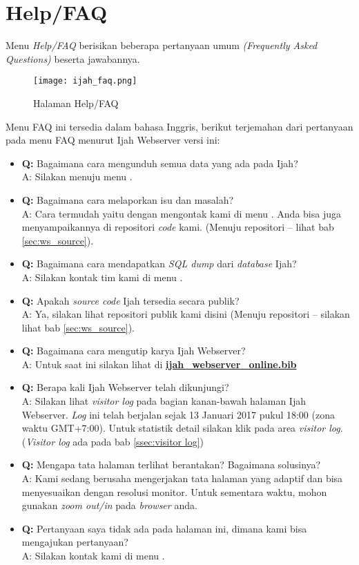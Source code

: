 \section{Help/FAQ}
Menu \emph{Help/FAQ} berisikan beberapa pertanyaan umum \emph{(Frequently Asked Questions)} beserta jawabannya.

\begin{figure}[H]
	\centering
	\texttt{[image: ijah\_faq.png]}
	\caption{Halaman Help/FAQ}
	\label{fig:ijah_faq}
\end{figure}

Menu FAQ ini tersedia dalam bahasa Inggris, berikut terjemahan dari pertanyaan pada menu FAQ menurut Ijah Webserver versi ini:

\begin{itemize}
\item {\textbf{Q:}} Bagaimana cara mengunduh semua data yang ada pada Ijah?\\
A: Silakan menuju menu \textbf{}.
\item {\textbf{Q:}} Bagaimana cara melaporkan isu dan masalah?\\
A: Cara termudah yaitu dengan mengontak kami di menu \textbf{}. Anda bisa juga menyampaikannya di repositori \emph{code} kami. (Menuju repositori -- lihat bab \ref{sec:ws_source}).
\item {\textbf{Q:}} Bagaimana cara mendapatkan \emph{SQL dump} dari \emph{database} Ijah?\\
A: Silakan kontak tim kami di menu \textbf{}.
\item {\textbf{Q:}} Apakah \emph{source code} Ijah tersedia secara publik?\\
A: Ya, silakan lihat repositori publik kami disini (Menuju repositori -- silakan lihat bab \ref{sec:ws_source}).
\item {\textbf{Q:}} Bagaimana cara mengutip karya Ijah Webserver?\\
A: Untuk saat ini silakan lihat di \href{http://ijah.apps.cs.ipb.ac.id/api/ijah_webserver_online.bib}{\textbf{ijah\_webserver\_online.bib}}
\item {\textbf{Q:}} Berapa kali Ijah Webserver telah dikunjungi?\\
A: Silakan lihat \emph{visitor log} pada bagian kanan-bawah halaman Ijah Webserver. \emph{Log} ini telah berjalan sejak 13 Januari 2017 pukul 18:00 (zona waktu GMT+7:00). Untuk statistik detail silakan klik pada area \emph{visitor log}. (\emph{Visitor log} ada pada bab \ref{ssec:visitor log})
\item {\textbf{Q:}} Mengapa tata halaman terlihat berantakan? Bagaimana solusinya?\\
A: Kami sedang berusaha mengerjakan tata halaman yang adaptif dan bisa menyesuaikan dengan resolusi monitor. Untuk sementara waktu, mohon gunakan \emph{zoom out/in} pada \emph{browser} anda.
\item {\textbf{Q:}} Pertanyaan saya tidak ada pada halaman ini, dimana kami bisa mengajukan pertanyaan?\\
A: Silakan kontak kami di menu \textbf{}.
\end{itemize}

